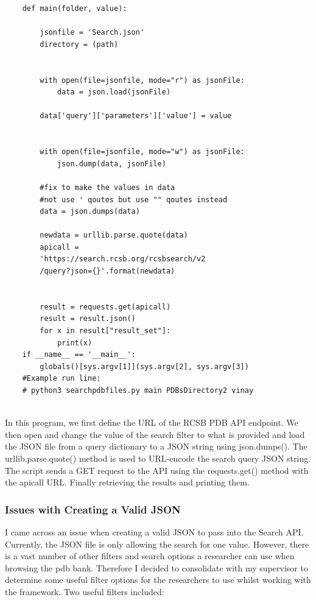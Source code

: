\documentclass[]{final_report}
\begin{document}
\begin{lstlisting}
    def main(folder, value):
    
        jsonfile = 'Search.json'
        directory = (path)
    
    
        with open(file=jsonfile, mode="r") as jsonFile:
            data = json.load(jsonFile)
    
        data['query']['parameters']['value'] = value
    
    
        with open(file=jsonfile, mode="w") as jsonFile:
            json.dump(data, jsonFile)
    
        #fix to make the values in data 
        #not use ' qoutes but use "" qoutes instead
        data = json.dumps(data)
    
        newdata = urllib.parse.quote(data)
        apicall = 
        'https://search.rcsb.org/rcsbsearch/v2
        /query?json={}'.format(newdata)
    
    
        result = requests.get(apicall)
        result = result.json()
        for x in result["result_set"]:
            print(x)
    if __name__ == '__main__':
        globals()[sys.argv[1]](sys.argv[2], sys.argv[3])
    #Example run line: 
    # python3 searchpdbfiles.py main PDBsDirectory2 vinay
    
\end{lstlisting}

In this program, we first define the URL of the RCSB PDB API endpoint. We then open and change the value of the search filter to what is provided and load the JSON file from a query dictionary to a JSON string using json.dumps(). The urllib.parse.quote() method is used to URL-encode the search query JSON string. The script sends a GET request to the API using the requests.get() method with the apicall URL. Finally retrieving the results and printing them.

\subsubsection{Issues with Creating a Valid JSON}

I came across an issue when creating a valid JSON to pass into the Search API. Currently, the JSON file is only allowing the search for one value. However, there is a vast number of other filters and search options a researcher can use when browsing the pdb bank. Therefore I decided to consolidate with my supervisor to determine some useful filter options for the researchers to use whilst working with the framework. Two useful filters included:
\end{document}
